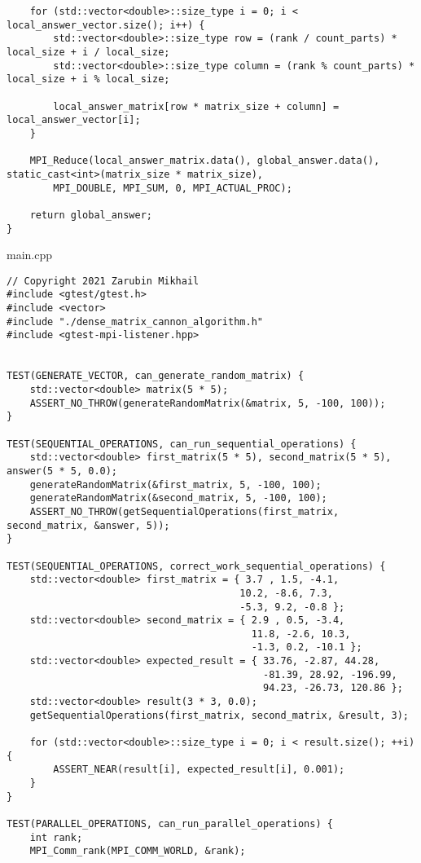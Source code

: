 \documentclass{report}
\begin{document}
\begin{lstlisting}
    for (std::vector<double>::size_type i = 0; i < local_answer_vector.size(); i++) {
        std::vector<double>::size_type row = (rank / count_parts) * local_size + i / local_size;
        std::vector<double>::size_type column = (rank % count_parts) * local_size + i % local_size;

        local_answer_matrix[row * matrix_size + column] = local_answer_vector[i];
    }

    MPI_Reduce(local_answer_matrix.data(), global_answer.data(), static_cast<int>(matrix_size * matrix_size),
        MPI_DOUBLE, MPI_SUM, 0, MPI_ACTUAL_PROC);

    return global_answer;
}

\end{lstlisting}
main.cpp
\begin{lstlisting}
// Copyright 2021 Zarubin Mikhail
#include <gtest/gtest.h>
#include <vector>
#include "./dense_matrix_cannon_algorithm.h"
#include <gtest-mpi-listener.hpp>


TEST(GENERATE_VECTOR, can_generate_random_matrix) {
    std::vector<double> matrix(5 * 5);
    ASSERT_NO_THROW(generateRandomMatrix(&matrix, 5, -100, 100));
}

TEST(SEQUENTIAL_OPERATIONS, can_run_sequential_operations) {
    std::vector<double> first_matrix(5 * 5), second_matrix(5 * 5), answer(5 * 5, 0.0);
    generateRandomMatrix(&first_matrix, 5, -100, 100);
    generateRandomMatrix(&second_matrix, 5, -100, 100);
    ASSERT_NO_THROW(getSequentialOperations(first_matrix, second_matrix, &answer, 5));
}

TEST(SEQUENTIAL_OPERATIONS, correct_work_sequential_operations) {
    std::vector<double> first_matrix = { 3.7 , 1.5, -4.1,
                                        10.2, -8.6, 7.3,
                                        -5.3, 9.2, -0.8 };
    std::vector<double> second_matrix = { 2.9 , 0.5, -3.4,
                                          11.8, -2.6, 10.3,
                                          -1.3, 0.2, -10.1 };
    std::vector<double> expected_result = { 33.76, -2.87, 44.28,
                                            -81.39, 28.92, -196.99,
                                            94.23, -26.73, 120.86 };
    std::vector<double> result(3 * 3, 0.0);
    getSequentialOperations(first_matrix, second_matrix, &result, 3);

    for (std::vector<double>::size_type i = 0; i < result.size(); ++i) {
        ASSERT_NEAR(result[i], expected_result[i], 0.001);
    }
}

TEST(PARALLEL_OPERATIONS, can_run_parallel_operations) {
    int rank;
    MPI_Comm_rank(MPI_COMM_WORLD, &rank);


\end{lstlisting}
\end{document}
